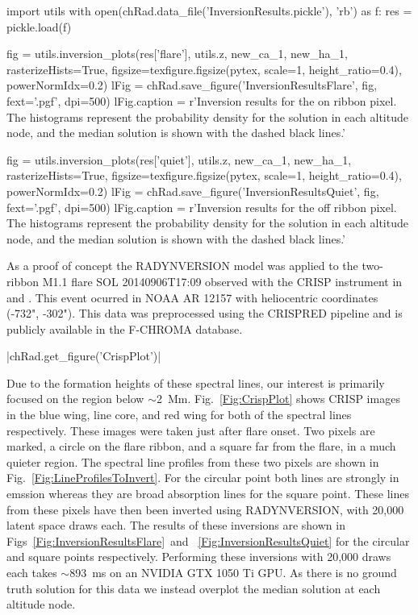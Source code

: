\begin{pycode}[Radynversion]
import utils
with open(chRad.data_file('InversionResults.pickle'), 'rb') as f:
    res = pickle.load(f)

fig = utils.inversion_plots(res['flare'], utils.z, new_ca_1, new_ha_1, rasterizeHists=True, figsize=texfigure.figsize(pytex, scale=1, height_ratio=0.4), powerNormIdx=0.2)
lFig = chRad.save_figure('InversionResultsFlare', fig, fext='.pgf', dpi=500)
lFig.caption = r'Inversion results for the on ribbon pixel. The histograms represent the probability density for the solution in each altitude node, and the median solution is shown with the dashed black lines.'

fig = utils.inversion_plots(res['quiet'], utils.z, new_ca_1, new_ha_1, rasterizeHists=True, figsize=texfigure.figsize(pytex, scale=1, height_ratio=0.4), powerNormIdx=0.2)
lFig = chRad.save_figure('InversionResultsQuiet', fig, fext='.pgf', dpi=500)
lFig.caption = r'Inversion results for the off ribbon pixel. The histograms represent the probability density for the solution in each altitude node, and the median solution is shown with the dashed black lines.'
\end{pycode}

As a proof of concept the RADYNVERSION model was applied to the two-ribbon M1.1 flare SOL 20140906T17:09 observed with the CRISP instrument in \Ha{} and \CaLine{}.
This event ocurred in NOAA AR 12157 with heliocentric coordinates (-732", -302").
This data was preprocessed using the CRISPRED pipeline \citep{2015dlcr} and is publicly available in the F-CHROMA database.

\py[Radynversion]|chRad.get_figure('CrispPlot')|

Due to the formation heights of these spectral lines, our interest is primarily focused on the region below $\sim$\SI{2}{\mega\metre}.
Fig.~\ref{Fig:CrispPlot} shows CRISP images in the blue wing, line core, and red wing for both of the spectral lines respectively.
These images were taken just after flare onset.
Two pixels are marked, a circle on the flare ribbon, and a square far from the flare, in a much quieter region.
The spectral line profiles from these two pixels are shown in Fig.~\ref{Fig:LineProfilesToInvert}.
For the circular point both lines are strongly in emssion whereas they are broad absorption lines for the square point.
These lines from these pixels have then been inverted using RADYNVERSION, with 20,000 latent space draws each.
The results of these inversions are shown in Figs~\ref{Fig:InversionResultsFlare}~and~
\ref{Fig:InversionResultsQuiet} for the circular and square points respectively.
Performing these inversions with 20,000 draws each takes $\sim$\SI{893}{\milli\second} on an NVIDIA GTX 1050 Ti GPU.
As there is no ground truth solution for this data we instead overplot the median solution at each altitude node.

